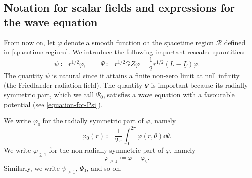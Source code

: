 \documentclass[10pt, reqno]{amsart}
\begin{document}
\subsection{Notation for scalar fields and expressions for the wave equation}
From now on, let \(\varphi{}\) denote a smooth function on the spacetime region
\(\mathcal{R}\) defined in \cref{spacetime-regions}. We introduce the following
important rescaled quantities:
\begin{equation}
\psi{}\coloneqq{}r^{1/2}\varphi{},\qquad \Psi{}\coloneqq{}r^{1/2}GZ\varphi{} = \frac{1}{2}r^{1/2}(L-\underline{L})\varphi{}.
\end{equation}
The quantity \(\psi{}\) is natural since it attains a finite non-zero limit at null
infinity (the Friedlander radiation field). The quantity \(\Psi{}\) is important
because its radially symmetric part, which we call \(\Psi_0\), satisfies a wave
equation with a favourable potential (see \cref{equation-for-Psi}).

We write \(\varphi_0\) for the radially symmetric part of \(\varphi{}\), namely
\begin{equation}
\varphi{}_0(r)\coloneqq{}\frac{1}{2\pi{}}\int_0^{2\pi{}} \varphi{}(r,\theta{})\dd{}\theta{}.
\end{equation}
We write \(\varphi_{\ge 1}\) for the non-radially symmetric part of \(\varphi{}\), namely
\begin{equation}
\varphi_{\ge 1} \coloneqq{}\varphi{} - \varphi_0.
\end{equation}
Similarly, we write \(\psi_{\ge 1}\), \(\Psi_0\), and so on.
\end{document}
